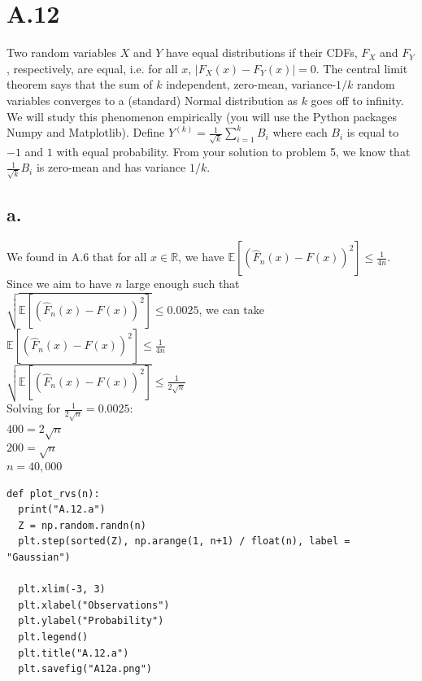 \documentclass{article}
\newcommand{\field}[1]{\mathbb{#1}}
\newcommand{\1}{\mathbf{1}}
\newcommand{\E}{\mathbb{E}}
\newcommand{\R}{\field{R}} %
\begin{document}
\section*{A.12}
{\Large 

Two random variables $X$ and $Y$ have equal
  distributions if their CDFs, $F_X$ and $F_Y$, respectively, are
  equal, i.e. for all $x$, $ |F_X(x) - F_Y(x)| = 0$. 
The central limit theorem says that the sum of $k$ independent,
zero-mean, variance-$1/k$ random variables converges to a (standard) Normal distribution as $k$ goes off to infinity.  
We will study this phenomenon empirically (you will use the Python packages Numpy and Matplotlib). 
Define $Y^{(k)} = \frac{1}{\sqrt{k}} \sum_{i=1}^k B_i$ where each $B_i$ is equal to $-1$ and $1$ with equal probability.
From your solution to problem 5, we know that $\frac{1}{\sqrt{k}} B_i$ is zero-mean and has variance $1/k$.

\subsection*{a.}
We found in A.6 that for all $x \in \R$, we have  $\displaystyle \E[ ( \widehat{F}_n(x) - F(x) )^2 ] \leq \tfrac{1}{4n}$. Since we aim to have $n$ large enough such that $ \sqrt{\E[(\widehat{F}_n(x)-F(x))^2 ]} \leq 0.0025$, we can take \\
$\E[ ( \widehat{F}_n(x) - F(x) )^2 ] \leq \tfrac{1}{4n}$ \\
$\sqrt{\E[ ( \widehat{F}_n(x) - F(x) )^2 ]} \leq \tfrac{1}{2\sqrt{n}}$ \\
Solving for $\frac{1}{2\sqrt{n}} = 0.0025$: \\
$400 = 2\sqrt{n}$ \\
$200 = \sqrt{n}$ \\
$n = 40,000$ \\

\begin{verbatim}
def plot_rvs(n):
  print("A.12.a")
  Z = np.random.randn(n)
  plt.step(sorted(Z), np.arange(1, n+1) / float(n), label = "Gaussian")

  plt.xlim(-3, 3)
  plt.xlabel("Observations")
  plt.ylabel("Probability")
  plt.legend()
  plt.title("A.12.a")
  plt.savefig("A12a.png")
\end{verbatim}

}
\end{document}
